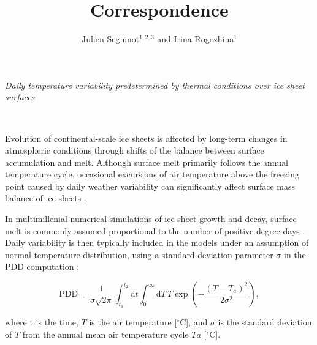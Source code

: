 \documentclass[review]{igs}
\begin{document}
\title[Correspondence]{Correspondence}
\author[Seguinot and Rogozhina]{Julien Seguinot$^{1,2,3}$ and Irina Rogozhina$^1$}

\maketitle


\emph{Daily temperature variability predetermined by thermal conditions over ice sheet surfaces}

~

Evolution of continental-scale ice sheets is affected by long-term changes in atmospheric conditions through shifts of the balance between surface accumulation and melt. Although surface melt primarily follows the annual temperature cycle, occasional excursions of air temperature above the freezing point caused by daily weather variability can significantly affect surface mass balance of ice sheets \citep{arnold-mackay-1964}.

In multimillenial numerical simulations of ice sheet growth and decay, surface melt is commonly assumed proportional to the number of positive degree-days \citep[PDD;][]{hock-2003}. Daily variability is then typically included in the models under an assumption of normal temperature distribution, using a standard deviation parameter $\sigma$ in the PDD computation \citep{braithwaite-1984,reeh-1991,calov-greve-2005};

\begin{equation} \label{eq:reeh}
  \mathrm{PDD} = \frac{1}{\sigma\sqrt{2\pi}}
    \int_{t_1}^{t_2} \mathrm{d}t
    \int_{0}^{\infty} \mathrm{d}T \,
    T \exp\left({-\frac{(T-T_a)^2}{2\sigma^2}}\right),
\end{equation}

where t is the time, $T$ is the air temperature [$^\circ$C], and $\sigma$ is the standard deviation of $T$ from the annual mean air temperature cycle $Ta$ [$^\circ$C].
\end{document}
